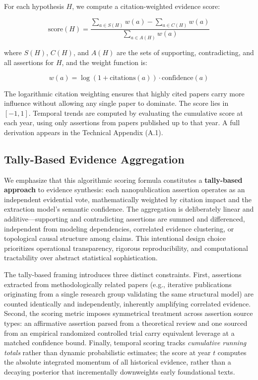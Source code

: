 \documentclass[
]{article}
\begin{document}
For each hypothesis \(H\), we compute a citation-weighted evidence
score:

\[
\text{score}(H) = \frac{\sum_{a \in S(H)} w(a) - \sum_{a \in C(H)} w(a)}{\sum_{a \in A(H)} w(a)}
\]

where \(S(H)\), \(C(H)\), and \(A(H)\) are the sets of supporting,
contradicting, and all assertions for \(H\), and the weight function is:

\[
w(a) = \log(1 + \text{citations}(a)) \cdot \text{confidence}(a)
\]

The logarithmic citation weighting ensures that highly cited papers
carry more influence without allowing any single paper to dominate. The
score lies in \([-1, 1]\). Temporal trends are computed by evaluating
the cumulative score at each year, using only assertions from papers
published up to that year. A full derivation appears in the Technical
Appendix (A.1).

\subsection{Tally-Based Evidence
Aggregation}\label{tally-based-evidence-aggregation}

We emphasize that this algorithmic scoring formula constitutes a
\textbf{tally-based approach} to evidence synthesis: each
nanopublication assertion operates as an independent evidential vote,
mathematically weighted by citation impact and the extraction model's
semantic confidence. The aggregation is deliberately linear and
additive---supporting and contradicting assertions are summed and
differenced, independent from modeling dependencies, correlated evidence
clustering, or topological causal structure among claims. This
intentional design choice prioritizes operational transparency, rigorous
reproducibility, and computational tractability over abstract
statistical sophistication.

The tally-based framing introduces three distinct constraints. First,
assertions extracted from methodologically related papers (e.g.,
iterative publications originating from a single research group
validating the same structural model) are counted identically and
independently, inherently amplifying correlated evidence. Second, the
scoring metric imposes symmetrical treatment across assertion source
types: an affirmative assertion parsed from a theoretical review and one
sourced from an empirical randomized controlled trial carry equivalent
leverage at a matched confidence bound. Finally, temporal scoring tracks
\emph{cumulative running totals} rather than dynamic probabilistic
estimates; the score at year \(t\) computes the absolute integrated
momentum of all historical evidence, rather than a decaying posterior
that incrementally downweights early foundational texts.
\end{document}
